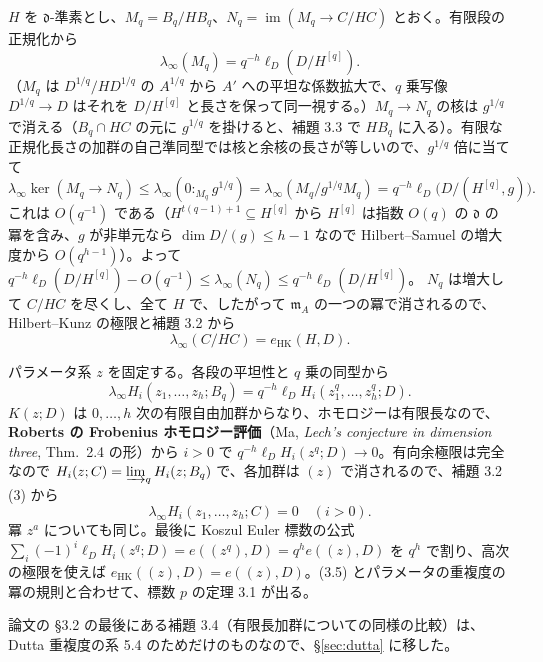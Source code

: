 \documentclass[11pt,a4paper]{ltjsarticle}
\theoremstyle{plain}
\theoremstyle{definition}
\newcommand{\m}{\mathfrak{m}}
\newcommand{\dd}{\mathfrak{d}}
\newcommand{\im}{\operatorname{im}}
\newcommand{\eHK}{e_{\mathrm{HK}}}
\begin{document}
$H$ を $\dd$-準素とし、$M_q = B_q/HB_q$、$N_q = \im(M_q\to C/HC)$ とおく。有限段の正規化から
\begin{equation}\tag{3.3}
  \lambda_\infty(M_q) = q^{-h}\ell_D(D/H^{[q]}).
\end{equation}
（$M_q$ は $D^{1/q}/HD^{1/q}$ の $A^{1/q}$ から $A'$ への平坦な係数拡大で、$q$ 乗写像 $D^{1/q}\to D$ はそれを $D/H^{[q]}$ と長さを保って同一視する。）$M_q\to N_q$ の核は $g^{1/q}$ で消える（$B_q\cap HC$ の元に $g^{1/q}$ を掛けると、補題 3.3 で $HB_q$ に入る）。有限な正規化長さの加群の自己準同型では核と余核の長さが等しいので、$g^{1/q}$ 倍に当てて
\begin{equation}\tag{3.4}
  \lambda_\infty\ker(M_q\to N_q)\le\lambda_\infty(0:_{M_q}g^{1/q}) = \lambda_\infty(M_q/g^{1/q}M_q) = q^{-h}\ell_D\bigl(D/(H^{[q]},g)\bigr).
\end{equation}
これは $O(q^{-1})$ である（$H^{t(q-1)+1}\subseteq H^{[q]}$ から $H^{[q]}$ は指数 $O(q)$ の $\dd$ の冪を含み、$g$ が非単元なら $\dim D/(g)\le h-1$ なので Hilbert--Samuel の増大度から $O(q^{h-1})$）。よって
$q^{-h}\ell_D(D/H^{[q]})-O(q^{-1})\le\lambda_\infty(N_q)\le q^{-h}\ell_D(D/H^{[q]})$。
$N_q$ は増大して $C/HC$ を尽くし、全て $H$ で、したがって $\m_A$ の一つの冪で消されるので、Hilbert--Kunz の極限と補題 3.2 から
\begin{equation}\tag{3.5}
  \lambda_\infty(C/HC) = \eHK(H,D).
\end{equation}

パラメータ系 $z$ を固定する。各段の平坦性と $q$ 乗の同型から
\begin{equation}\tag{3.6}
  \lambda_\infty H_i(z_1,\dots,z_h;B_q) = q^{-h}\ell_DH_i(z_1^q,\dots,z_h^q;D).
\end{equation}
$K(z;D)$ は $0,\dots,h$ 次の有限自由加群からなり、ホモロジーは有限長なので、\textbf{Roberts の Frobenius ホモロジー評価}（Ma, \emph{Lech's conjecture in dimension three}, Thm.~2.4 の形）から $i>0$ で $q^{-h}\ell_DH_i(z^q;D)\to0$。有向余極限は完全なので $H_i(z;C) = \varinjlim_qH_i(z;B_q)$ で、各加群は $(z)$ で消されるので、補題 3.2 (3) から
\begin{equation}\tag{3.7}
  \lambda_\infty H_i(z_1,\dots,z_h;C) = 0\quad(i>0).
\end{equation}
冪 $z^a$ についても同じ。最後に Koszul Euler 標数の公式 $\sum_i(-1)^i\ell_DH_i(z^q;D) = e((z^q),D) = q^he((z),D)$ を $q^h$ で割り、高次の極限を使えば $\eHK((z),D) = e((z),D)$。(3.5) とパラメータの重複度の冪の規則と合わせて、標数 $p$ の定理 3.1 が出る。

論文の \S3.2 の最後にある補題 3.4（有限長加群についての同様の比較）は、Dutta 重複度の系 5.4 のためだけのものなので、\S\ref{sec:dutta} に移した。
\end{document}
